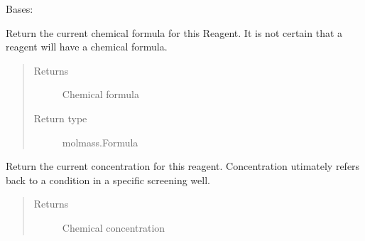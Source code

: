 \documentclass[letterpaper,10pt,english]{sphinxmanual}
\begin{document}
\begin{fulllineitems}
\label{\detokenize{polo.crystallography:polo.crystallography.cocktail.Reagent}}
Bases: 

\begin{fulllineitems}
\label{\detokenize{polo.crystallography:polo.crystallography.cocktail.Reagent.chemical_formula}}
Return the current chemical formula for this Reagent. It is not
certain that a reagent will have a chemical formula.
\begin{quote}\begin{description}
\item[{Returns}] \leavevmode
Chemical formula

\item[{Return type}] \leavevmode
molmass.Formula

\end{description}\end{quote}

\end{fulllineitems}


\begin{fulllineitems}
\label{\detokenize{polo.crystallography:polo.crystallography.cocktail.Reagent.concentration}}
Return the current concentration for this reagent. Concentration
utimately refers back to a condition in a specific screening well.
\begin{quote}\begin{description}
\item[{Returns}] \leavevmode
Chemical concentration


\end{description}
\end{quote}
\end{fulllineitems}
\end{fulllineitems}
\end{document}
